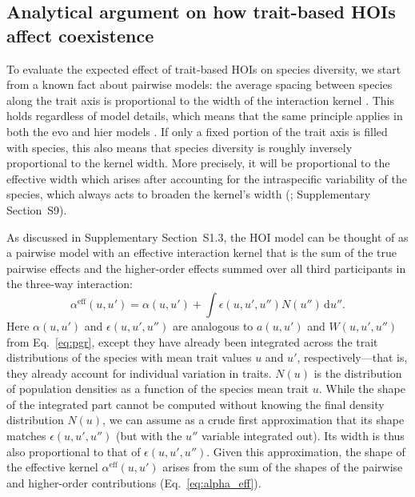 \documentclass[11pt]{article}
\newcommand{\ud}{\mathrm{d}}
\newcommand{\SI}{Supplementary}
\begin{document}
\subsection{Analytical argument on how trait-based HOIs affect coexistence} \label{sec:anal}

To evaluate the expected effect of trait-based HOIs on species diversity, we start from a known fact about pairwise models: the average spacing between species along the trait axis is proportional to the width of the interaction kernel \citep{macarthur_limiting_1967, szabo_limiting_2006, barabas_when_2009, barabas_effect_2016}. This holds regardless of model details, which means that the same principle applies in both the evo and hier models \citep{barabas_continuous_2012, dandrea_revising_2013}. If only a fixed portion of the trait axis is filled with species, this also means that species diversity is roughly inversely proportional to the kernel width. More precisely, it will be proportional to the effective width which arises after accounting for the intraspecific variability of the species, which always acts to broaden the kernel's width (\citealp{barabas_effect_2016}; \SI{} Section~S9).

As discussed in \SI{} Section~S1.3, the HOI model can be thought of as a pairwise model with an effective interaction kernel that is the sum of the true pairwise effects and the higher-order effects summed over all third participants in the three-way interaction:
\begin{equation}
  \label{eq:alpha_eff}
  \alpha^{\text{eff}}(u,u')
  = \alpha(u,u')
  + \int \epsilon(u,u',u'') N(u'') \,\ud u'' .
\end{equation}
Here $\alpha(u,u')$ and $\epsilon(u,u',u'')$ are analogous to $a(u,u')$ and $W(u,u',u'')$ from Eq.~\ref{eq:pgr}, except they have already been integrated across the trait distributions of the species with mean trait values $u$ and $u'$, respectively---that is, they already account for individual variation in traits. $N(u)$ is the distribution of population densities as a function of the species mean trait $u$. While the shape of the integrated part cannot be computed without knowing the final density distribution $N(u)$, we can assume as a crude first approximation that its shape matches $\epsilon(u,u',u'')$ (but with the $u''$ variable integrated out). Its width is thus also proportional to that of $\epsilon(u,u',u'')$. Given this approximation, the shape of the effective kernel $\alpha^{\text{eff}}(u,u')$ arises from the sum of the shapes of the pairwise and higher-order contributions (Eq.~\ref{eq:alpha_eff}).
\end{document}
